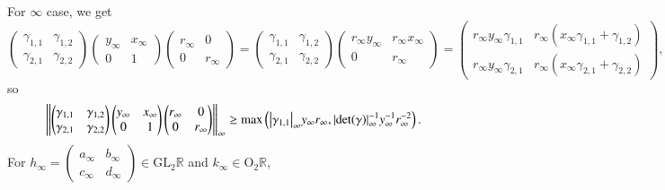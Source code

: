 \documentclass[a4paper, 12pt]{article}
\theoremstyle{Mydefinition}
\theoremstyle{Mytheorem}
\begin{document}
For $\infty$ case, we get
\begin{equation}
    \begin{pmatrix}
    \gamma_{1,1} & \gamma_{1,2}\\
    \gamma_{2,1} & \gamma_{2,2}
    \end{pmatrix} \begin{pmatrix}y_\infty & x_\infty\\ 0 & 1
    \end{pmatrix}\begin{pmatrix}r_\infty & 0\\ 0 & r_\infty
    \end{pmatrix} = \begin{pmatrix}
    \gamma_{1,1} & \gamma_{1,2}\\
    \gamma_{2,1} & \gamma_{2,2}
    \end{pmatrix} \begin{pmatrix}r_\infty y_\infty & r_\infty x_\infty\\ 0 & r_\infty
    \end{pmatrix} = \begin{pmatrix}
    r_\infty y_\infty\gamma_{1,1} & r_\infty(x_\infty\gamma_{1,1} + \gamma_{1,2})\\
    r_\infty y_\infty\gamma_{2,1} & r_\infty(x_\infty\gamma_{2,1} + \gamma_{2,2})
    \end{pmatrix},
\end{equation}
so
\begin{equation}
    \norm{\begin{pmatrix}
    \gamma_{1,1} & \gamma_{1,2}\\
    \gamma_{2,1} & \gamma_{2,2}
    \end{pmatrix} \begin{pmatrix}y_\infty & x_\infty\\ 0 & 1
    \end{pmatrix}\begin{pmatrix}r_\infty & 0\\ 0 & r_\infty
    \end{pmatrix}}_\infty \geq \max\left(\abs{\gamma_{1,1}}_\infty y_\infty r_\infty, \abs{\det(\gamma)}_\infty^{-1}y_\infty^{-1} r_\infty^{-2}\right).
\end{equation}
For $h_\infty = \begin{pmatrix}a_\infty & b_\infty \\ c_\infty & d_\infty\end{pmatrix}\in \mathrm{GL}_2\mathbb{R}$ and $k_\infty\in \mathrm{O}_2\mathbb{R}$,
\end{document}
